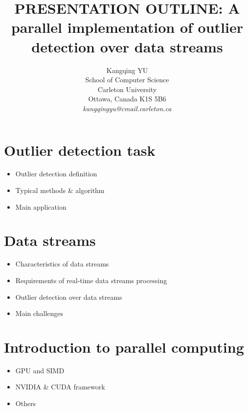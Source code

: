 \documentclass[11pt]{article}       %
\newenvironment{slide}[1]        {\section{#1} \begin{itemize}}%
                                 {\end{itemize}}
\begin{document}


\title{PRESENTATION OUTLINE: A parallel implementation of outlier detection over data streams}


\author{
Kangqing YU\\
School of Computer Science\\
Carleton University\\
Ottawa, Canada K1S 5B6\\
{\em kangqingyu@cmail.carleton.ca}
} %

\maketitle

\begin{slide}{Outlier detection task}
\item Outlier detection definition
\item Typical methods \& algorithm
\item Main application
\end{slide}


\begin{slide}{Data streams}
\item Characteristics of data streams
\item Requirements of real-time data streams processing
\item Outlier detection over data streams
\item Main challenges
\end{slide}

\begin{slide}{Introduction to parallel computing}
\item GPU and SIMD
\item NVIDIA \& CUDA framework
\item Others 
\end{slide}
\end{document}
